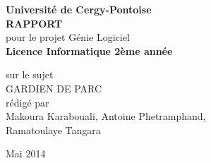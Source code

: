 
\begin{titlepage}{
    \begin{center}
        \vspace* {30mm}
        {\Large \textbf {Université de Cergy-Pontoise}} \\
        \vspace* {15mm}
        {\Large \textbf {RAPPORT}} \\
        \vspace* {15mm}
        pour le projet Génie Logiciel \\
        \textbf {Licence Informatique 2ème année} \\
        \vspace* {15mm}

	sur le sujet \\
        \vspace* {15mm}
	{\Huge \textsf{GARDIEN DE PARC}} \\
        \vspace* {10mm}
 	rédigé par \\
        \vspace* {10mm}
        \Large{} \textbf {} Makoura Karabouali, Antoine Phetramphand, \\Ramatoulaye Tangara\\
        \vspace* {10mm}
        \date \\ Mai 2014
        \vspace* {10mm}
	\end{center}
}
\end{titlepage}
